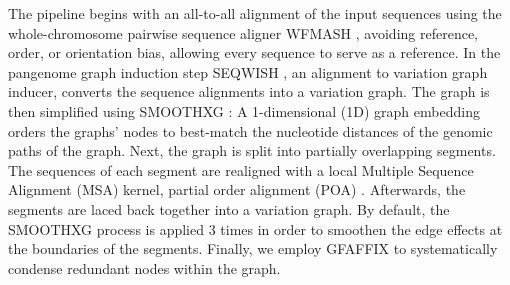 \documentclass{bioinfo}
\theoremstyle{definition}
\begin{document}
	The pipeline begins with an all-to-all alignment of the input sequences using the whole-chromosome pairwise sequence aligner WFMASH \citep{wfmash}, avoiding reference, order, or orientation bias, allowing every sequence to serve as a reference.
	In the pangenome graph induction step SEQWISH \citep{Garrison2022}, an alignment to variation graph inducer, converts the sequence alignments into a variation graph. 
	The graph is then simplified using SMOOTHXG \citep{Garrison2023}:
	A 1-dimensional (1D) graph embedding \citep{Heumos2023} orders the graphs’ nodes to best-match the nucleotide distances of the genomic paths of the graph.
	Next, the graph is split into partially overlapping segments. 
	The sequences of each segment are realigned with a local Multiple Sequence Alignment (MSA) kernel, partial order alignment (POA) \citep{Lee2002}.
	Afterwards, the segments are laced back together into a variation graph. 
	By default, the SMOOTHXG process is applied 3 times in order to smoothen the edge effects at the boundaries of the segments.
	Finally, we employ GFAFFIX \citep{Liao2023} to systematically condense redundant nodes within the graph.
	
\end{document}
